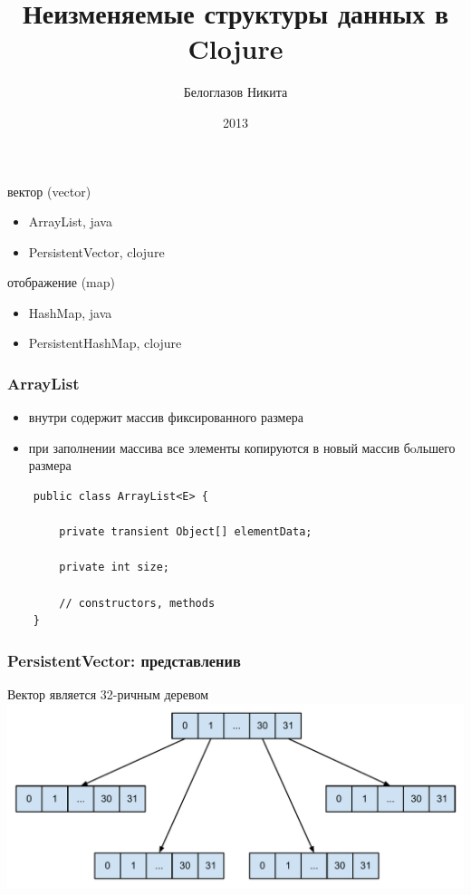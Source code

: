 \documentclass[rpussian]{beamer}
\title{Неизменяемые структуры данных в Clojure}
\author{Белоглазов Никита}
\date{2013}
\institute{Белорусский Государственный Университет}
\begin{document}
\maketitle
\begin{frame}[fragile]
  \begin{description} \itemsep1cm
  \item вектор (vector)
    \begin{itemize}
    \item ArrayList, java
    \item PersistentVector, clojure
    \end{itemize}
  \item отображение (map)
    \begin{itemize}
    \item HashMap, java
    \item PersistentHashMap, clojure
    \end{itemize}
  \end{description}
\end{frame}

\begin{frame}[fragile]
  \frametitle{ArrayList}
  \begin{itemize}
  \item внутри содержит массив фиксированного размера
  \item при заполнении массива все элементы копируются в новый массив бoльшего размера
  \end{itemize}
  \begin{verbatim}
    public class ArrayList<E> {

        private transient Object[] elementData;

        private int size;

        // constructors, methods
    }
  \end{verbatim}
\end{frame}

\begin{frame}
  \frametitle{PersistentVector: представленив}
  Вектор является 32-ричным деревом \\
  \vspace{1cm}
  \includegraphics[width=\textwidth,keepaspectration]{32tree}
\end{frame}
\end{document}
